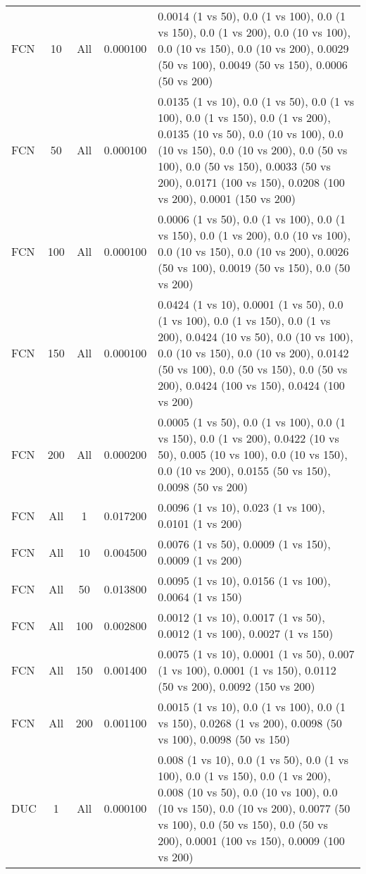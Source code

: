 \begin{tabular}{|l|c|c|c|p{7cm}|}
FCN & 10 & All & 0.000100 & 0.0014 (1 vs 50), 0.0 (1 vs 100), 0.0 (1 vs 150), 0.0 (1 vs 200), 0.0 (10 vs 100), 0.0 (10 vs 150), 0.0 (10 vs 200), 0.0029 (50 vs 100), 0.0049 (50 vs 150), 0.0006 (50 vs 200) \\
FCN & 50 & All & 0.000100 & 0.0135 (1 vs 10), 0.0 (1 vs 50), 0.0 (1 vs 100), 0.0 (1 vs 150), 0.0 (1 vs 200), 0.0135 (10 vs 50), 0.0 (10 vs 100), 0.0 (10 vs 150), 0.0 (10 vs 200), 0.0 (50 vs 100), 0.0 (50 vs 150), 0.0033 (50 vs 200), 0.0171 (100 vs 150), 0.0208 (100 vs 200), 0.0001 (150 vs 200) \\
FCN & 100 & All & 0.000100 & 0.0006 (1 vs 50), 0.0 (1 vs 100), 0.0 (1 vs 150), 0.0 (1 vs 200), 0.0 (10 vs 100), 0.0 (10 vs 150), 0.0 (10 vs 200), 0.0026 (50 vs 100), 0.0019 (50 vs 150), 0.0 (50 vs 200) \\
FCN & 150 & All & 0.000100 & 0.0424 (1 vs 10), 0.0001 (1 vs 50), 0.0 (1 vs 100), 0.0 (1 vs 150), 0.0 (1 vs 200), 0.0424 (10 vs 50), 0.0 (10 vs 100), 0.0 (10 vs 150), 0.0 (10 vs 200), 0.0142 (50 vs 100), 0.0 (50 vs 150), 0.0 (50 vs 200), 0.0424 (100 vs 150), 0.0424 (100 vs 200) \\
FCN & 200 & All & 0.000200 & 0.0005 (1 vs 50), 0.0 (1 vs 100), 0.0 (1 vs 150), 0.0 (1 vs 200), 0.0422 (10 vs 50), 0.005 (10 vs 100), 0.0 (10 vs 150), 0.0 (10 vs 200), 0.0155 (50 vs 150), 0.0098 (50 vs 200) \\
FCN & All & 1 & 0.017200 & 0.0096 (1 vs 10), 0.023 (1 vs 100), 0.0101 (1 vs 200) \\
FCN & All & 10 & 0.004500 & 0.0076 (1 vs 50), 0.0009 (1 vs 150), 0.0009 (1 vs 200) \\
FCN & All & 50 & 0.013800 & 0.0095 (1 vs 10), 0.0156 (1 vs 100), 0.0064 (1 vs 150) \\
FCN & All & 100 & 0.002800 & 0.0012 (1 vs 10), 0.0017 (1 vs 50), 0.0012 (1 vs 100), 0.0027 (1 vs 150) \\
FCN & All & 150 & 0.001400 & 0.0075 (1 vs 10), 0.0001 (1 vs 50), 0.007 (1 vs 100), 0.0001 (1 vs 150), 0.0112 (50 vs 200), 0.0092 (150 vs 200) \\
FCN & All & 200 & 0.001100 & 0.0015 (1 vs 10), 0.0 (1 vs 100), 0.0 (1 vs 150), 0.0268 (1 vs 200), 0.0098 (50 vs 100), 0.0098 (50 vs 150) \\
DUC & 1 & All & 0.000100 & 0.008 (1 vs 10), 0.0 (1 vs 50), 0.0 (1 vs 100), 0.0 (1 vs 150), 0.0 (1 vs 200), 0.008 (10 vs 50), 0.0 (10 vs 100), 0.0 (10 vs 150), 0.0 (10 vs 200), 0.0077 (50 vs 100), 0.0 (50 vs 150), 0.0 (50 vs 200), 0.0001 (100 vs 150), 0.0009 (100 vs 200) \\

\end{tabular}
